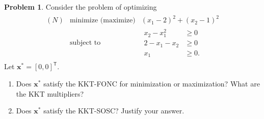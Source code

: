 \documentclass[12pt]{article}
\theoremstyle{definition}
\newtheorem{problem}{Problem}
\newcommand{\vc}[1]{\boldsymbol{#1}}
\newcommand{\tran}{\mathsf{T}}
\begin{document}
\begin{problem}
  Consider the problem of optimizing
  \begin{align*}
    \begin{array}{rll}
      (N) & \text{minimize $($maximize$)$} & (x_1 - 2)^2 + (x_2 -1)^2 \\
      & \text{subject to} &
      \begin{array}{ll}
        x_2 - x_1^2 &\geq 0\\
        2 - x_1 - x_2 &\geq 0 \\
        x_1 &\geq 0.
      \end{array}
    \end{array}
  \end{align*}
  Let $\vc{x}^* = [0, 0]^\tran$.
  \begin{enumerate}
    \item Does $\vc{x}^*$ satisfy the KKT-FONC for minimization or maximization? What are the KKT
      multipliers?
    \item Does $\vc{x}^*$ satisfy the KKT-SOSC? Justify your answer.
  \end{enumerate}
\end{problem}
\end{document}

